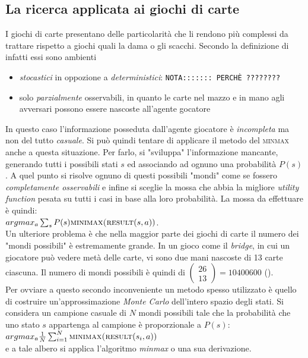 \subsection{La ricerca applicata ai giochi di carte}

I giochi di carte presentano delle particolarità che li rendono più complessi da trattare rispetto a giochi quali la dama o gli scacchi.
Secondo la definizione di \cite{randw} infatti essi sono ambienti
\begin{itemize}
   \item \emph{stocastici} in oppozione a \emph{deterministici}: \texttt{NOTA::::::: PERCHÈ ????????}
   \item solo \emph{parzialmente} osservabili, in quanto le carte nel mazzo e in mano agli avversari possono essere nascoste all'agente gocatore
\end{itemize}

In questo caso l'informazione posseduta dall'agente giocatore è \emph{incompleta} ma non del tutto \emph{casuale}.
Si può quindi tentare di applicare il metodo del \textsc{minmax} anche a questa situazione.
Per farlo, si "sviluppa" l'informazione mancante, generando tutti i possibili stati $s$ ed associando ad ognuno una probabilità $P(s)$.
A quel punto si risolve ognuno di questi possibili "mondi" come se fossero \emph{completamente osservabili} e infine si sceglie la mossa che abbia la migliore \emph{utility function} pesata su tutti i casi in base alla loro probabilità.
La mossa da effettuare è quindi:\\

$ argmax_a \sum_{s} P(s) \textsc{minimax(result}(s,a)) $.\\

Un ulteriore problema è che nella maggior parte dei giochi di carte il numero dei "mondi possibili" è estremamente grande.
In un gioco come il \emph{bridge}, in cui un giocatore può vedere metà delle carte, vi sono due mani nascoste di 13 carte ciascuna.
Il numero di mondi possibili è quindi di $ \left(\! \begin{array}{c} 26 \\  13\end{array}\!\right)  = 10 400 600 $ (\cite{randw}).\\
Per ovviare a questo secondo inconveniente un metodo spesso utilizzato è quello di costruire un'approssimazione \emph{Monte Carlo} dell'intero spazio degli stati.
Si considera un campione casuale di $N$ mondi possibili tale che la probabilità che uno stato $s$ appartenga al campione è proporzionale a $P(s)$:\\

$argmax_a \frac{1}{N} \sum_{i=1}^{N}  \textsc{minimax(result}(s_i,a)) $ \cite{randw}\\

e a tale albero si applica l'algoritmo \emph{minmax} o una sua derivazione.

